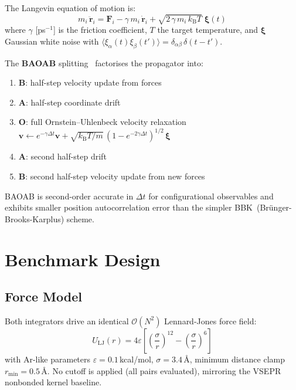 \documentclass[11pt,a4paper]{article}
\theoremstyle{definition}
\theoremstyle{plain}
\newcommand{\dt}{\Delta t}
\newcommand{\kb}{k_{\mathrm{B}}}
\begin{document}
The Langevin equation of motion is:
\begin{equation}
  m_i\,\ddot{\mathbf{r}}_i = \mathbf{F}_i
	- \gamma\,m_i\,\dot{\mathbf{r}}_i
	+ \sqrt{2\,\gamma\,m_i\,\kb T}\;\boldsymbol{\xi}(t)
  \label{eq:langevin}
\end{equation}
where $\gamma$ [ps$^{-1}$] is the friction coefficient, $T$ the target
temperature, and $\boldsymbol{\xi}$ Gaussian white noise with
$\langle\xi_\alpha(t)\xi_\beta(t')\rangle = \delta_{\alpha\beta}\,\delta(t-t')$.

The \textbf{BAOAB} splitting~\cite{baoab2012} factorises the propagator into:
\begin{enumerate}
  \item \textbf{B}: half-step velocity update from forces
  \item \textbf{A}: half-step coordinate drift
  \item \textbf{O}: full Ornstein--Uhlenbeck velocity relaxation
	$\mathbf{v} \leftarrow e^{-\gamma\dt}\mathbf{v}
	+ \sqrt{\kb T/m}\,(1-e^{-2\gamma\dt})^{1/2}\,\boldsymbol{\xi}$
  \item \textbf{A}: second half-step drift
  \item \textbf{B}: second half-step velocity update from new forces
\end{enumerate}

BAOAB is second-order accurate in $\dt$ for configurational observables
and exhibits smaller position autocorrelation error than the simpler
BBK~(Br{\"u}nger-Brooks-Karplus) scheme.

\section{Benchmark Design}
\label{sec:design}

\subsection{Force Model}

Both integrators drive an identical $\mathcal{O}(N^2)$ Lennard-Jones
force field:
\begin{equation}
  U_{\mathrm{LJ}}(r) = 4\varepsilon\left[
	\left(\frac{\sigma}{r}\right)^{12}
	- \left(\frac{\sigma}{r}\right)^{6}\right]
  \label{eq:lj}
\end{equation}
with Ar-like parameters $\varepsilon = 0.1$\,kcal/mol,
$\sigma = 3.4$\,\AA, minimum distance clamp $r_{\min} = 0.5$\,\AA.
No cutoff is applied (all pairs evaluated), mirroring the VSEPR nonbonded
kernel baseline.
\end{document}
